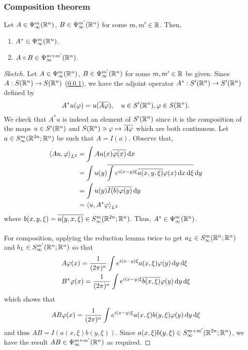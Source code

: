 \documentclass{article}
\begin{document}
\subsubsection{Composition theorem}
\begin{ftheorem}[Composition]
    Let $A \in \Psi^{m}_\infty(\R^n)$, $B \in \Psi^{m'}_\infty(\R^n)$ for some $m, m' \in \R$. Then, 
    \begin{enumerate}
        \item $A^* \in \Psi^{m}_\infty(\R^n)$.
        \item $A \circ B \in \Psi^{m + m'}_\infty(\R^n)$. 
    \end{enumerate}
\end{ftheorem}
\begin{proof}[Sketch]
    Let $A \in \Psi^{m}_\infty(\R^n)$, $B \in \Psi^{m'}_\infty(\R^n)$ for some $m, m' \in \R$ be given. 
    Since $A : S(\R^n) \to S(\R^n)$ (\ref{}), we have the adjoint operator $A^* : S'(\R^n) \to S'(\R^n)$ defined by 
    \begin{align*}
    A^*u(\varphi) = u(\overline{A\varphi}), \quad u \in S'(\R^n), \varphi \in S(\R^n). 
    \end{align*}
    We check that $A^*u$ is indeed an element of $S'(\R^n)$ since it is the composition of the maps $u \in S'(\R^n)$ and $S(\R^n) \ni \varphi \mapsto \overline{A\varphi}$ which are both continuous.  Let $a \in S^{m}_\infty(\R^{2n}; \R^n)$ be such that $A = I(a)$. Observe that, 
    \begin{align*}
    \inprod[Au, \varphi]_{L^2} 
    & = \int Au(x) \overline{\varphi(x)}\d[x]  \\
    & = \int u(y) \overline{\int e^{i(x - y) \xi} \overline{a(x, y, \xi)} \varphi(x) \d[x] \d[\xi]} \d[y] \\
    & = \int u(y) \overline{I(b) \varphi(y)}\d[y]\\
    & = \inprod[u, A^*\varphi]_{L^2}
    \end{align*}
    where $b(x, y, \xi) = \overline{a(y, x, \xi)} \in S^{m}_\infty(\R^{2n}; \R^n)$. Thus, $A^* \in \Psi^{m}_\infty(\R^n)$. \\
    \\
    For composition, applying the reduction lemma twice to get $a_L \in S^{m}_\infty(\R^{n}; \R^n)$ and $b_L \in S^{m'}_\infty(\R^{n}; \R^n)$ so that 
    \begin{align*}
    &A \varphi(x) = \frac{1}{(2\pi)^n} \int e^{i(x -y) \xi} a(x, \xi) \varphi(y) \d[y] \d[\xi] \\
    &B^* \varphi(x) = \frac{1}{(2\pi)^n} \int e^{i(x -y) \xi} \overline{b(x, \xi) }\varphi(y) \d[y] \d[\xi]
    \end{align*}
    which shows that 
    \begin{align*}
    AB\varphi(x) = \frac{1}{(2\pi)^n} \int e^{i(x -y) \xi} a(x, \xi) b(y, \xi) \varphi(y) \d[y] \d[\xi]
    \end{align*}
    and thus $AB = I(a(x, \xi) b(y, \xi))$. Since $a(x, \xi)b(y, \xi) \in S^{m + m'}_\infty(\R^{2n}; \R^n)$, we have the result $AB \in \Psi^{m + m'}_\infty(\R^n)$ as required. 
    
\end{proof}
\end{document}
